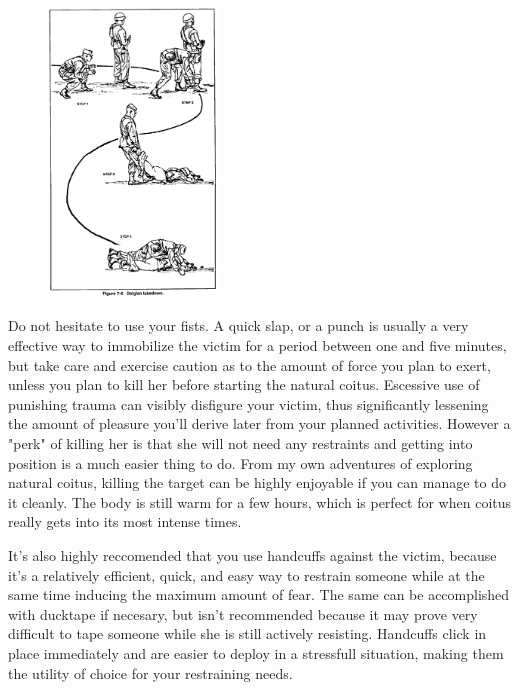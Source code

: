 \begin{figure}
\includegraphics[width=0.4\textwidth]{images/belgian_takedown.png}
\end{figure}



Do not hesitate to use your fists. A quick slap, or a punch is usually a very effective way to immobilize
the victim for a period between one and five minutes, but take care and exercise caution as to the amount of force
you plan to exert, unless you plan to kill her before starting the natural coitus. Escessive use of punishing 
trauma can visibly disfigure your victim, thus significantly lessening the amount of pleasure you'll derive later 
from your planned activities. However a "perk" of killing her is that she will not need any restraints and getting 
into position is a much easier thing to do. From my own adventures of exploring natural coitus, killing the target
can be highly enjoyable if you can manage to do it cleanly. The body is still warm for a few hours, which is perfect 
for when coitus really gets into its most intense times.



It's also highly reccomended that you use handcuffs against the victim, because it's a relatively efficient,
quick, and easy way to restrain someone while at the same time inducing the maximum amount of fear. The same can
be accomplished with ducktape if necesary, but isn't recommended because it may prove very difficult to tape
someone while she is still actively resisting. Handcuffs click in place immediately and are easier to deploy
in a stressfull situation, making them the utility of choice for your restraining needs.


